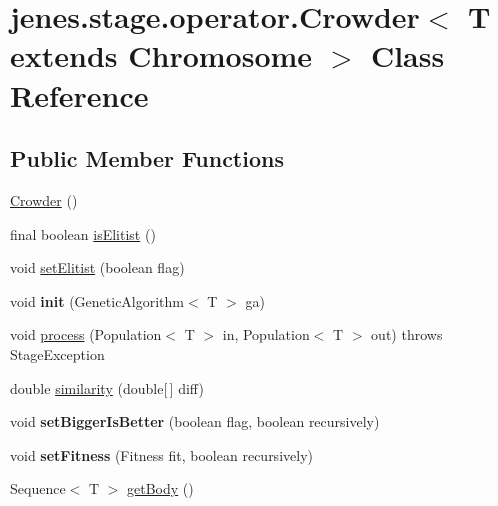 \hypertarget{classjenes_1_1stage_1_1operator_1_1_crowder_3_01_t_01extends_01_chromosome_01_4}{
\section{jenes.stage.operator.Crowder$<$ T extends Chromosome $>$ Class Reference}
\label{classjenes_1_1stage_1_1operator_1_1_crowder_3_01_t_01extends_01_chromosome_01_4}
}
\subsection*{Public Member Functions}
\begin{CompactItemize}
\item 
\hyperlink{classjenes_1_1stage_1_1operator_1_1_crowder_3_01_t_01extends_01_chromosome_01_4_6e23e3544b98e1a415c53fcedd541df5}{Crowder} ()
\item 
final boolean \hyperlink{classjenes_1_1stage_1_1operator_1_1_crowder_3_01_t_01extends_01_chromosome_01_4_b9bb2a8d6bf09a51158ef49917095913}{isElitist} ()
\item 
void \hyperlink{classjenes_1_1stage_1_1operator_1_1_crowder_3_01_t_01extends_01_chromosome_01_4_d995907f114cdd40eb03d53f05734b8c}{setElitist} (boolean flag)
\item 
\hypertarget{classjenes_1_1stage_1_1operator_1_1_crowder_3_01_t_01extends_01_chromosome_01_4_345ecb8e82d64130d171fb785f2702e6}{
void \textbf{init} (GeneticAlgorithm$<$ T $>$ ga)}
\label{classjenes_1_1stage_1_1operator_1_1_crowder_3_01_t_01extends_01_chromosome_01_4_345ecb8e82d64130d171fb785f2702e6}

\item 
void \hyperlink{classjenes_1_1stage_1_1operator_1_1_crowder_3_01_t_01extends_01_chromosome_01_4_21f0859b05e06d7ee4b979d5a2d559d7}{process} (Population$<$ T $>$ in, Population$<$ T $>$ out)  throws StageException 
\item 
double \hyperlink{classjenes_1_1stage_1_1operator_1_1_crowder_3_01_t_01extends_01_chromosome_01_4_99b3aaad504589efa9c408fc1b4e2fa1}{similarity} (double\mbox{[}$\,$\mbox{]} diff)
\item 
\hypertarget{classjenes_1_1stage_1_1operator_1_1_crowder_3_01_t_01extends_01_chromosome_01_4_65ef754570b25a6f14fbd78e6c08c4f9}{
void \textbf{setBiggerIsBetter} (boolean flag, boolean recursively)}
\label{classjenes_1_1stage_1_1operator_1_1_crowder_3_01_t_01extends_01_chromosome_01_4_65ef754570b25a6f14fbd78e6c08c4f9}

\item 
\hypertarget{classjenes_1_1stage_1_1operator_1_1_crowder_3_01_t_01extends_01_chromosome_01_4_c6c89c383d27754be63fabc951e11dc8}{
void \textbf{setFitness} (Fitness fit, boolean recursively)}
\label{classjenes_1_1stage_1_1operator_1_1_crowder_3_01_t_01extends_01_chromosome_01_4_c6c89c383d27754be63fabc951e11dc8}

\item 
Sequence$<$ T $>$ \hyperlink{classjenes_1_1stage_1_1operator_1_1_crowder_3_01_t_01extends_01_chromosome_01_4_4b24910de47aff7c5a709846af74b199}{getBody} ()
\end{CompactItemize}
